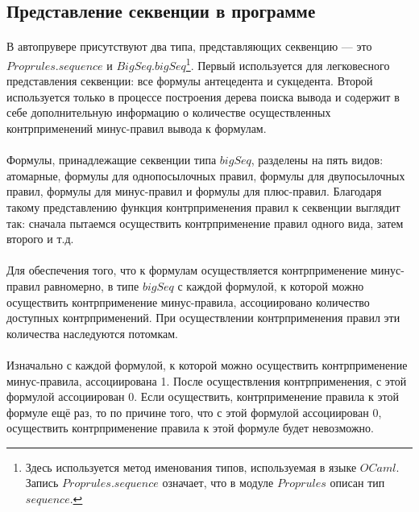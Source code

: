 \documentclass{cw1}
\begin{document}
\subsection{Представление секвенции в программе}
\label{sec:sequences}
\paragraph{}
В автопрувере присутствуют два типа, представляющих секвенцию --- это $Proprules.sequence$ и
$BigSeq.bigSeq$\footnote{Здесь используется метод именования типов, используемая в языке $OCaml$.
Запись $Proprules.sequence$ означает, что в модуле $Proprules$ описан тип $sequence$.}.
Первый используется для легковесного представления секвенции: все формулы
антецедента и сукцедента. Второй используется только в процессе построения дерева поиска вывода
и содержит в себе дополнительную информацию о количестве осуществленных контрприменений
минус-правил вывода к формулам. 
\paragraph{}
Формулы, принадлежащие секвенции типа $bigSeq$, разделены на пять видов: атомарные, формулы для
однопосылочных правил, формулы для двупосылочных правил, формулы для минус-правил и формулы                                                             
для плюс-правил. Благодаря такому представлению функция контрприменения
правил к секвенции выглядит так: сначала пытаемся осуществить контрприменение правил одного
вида, затем второго и т.д.
\paragraph{}
Для обеспечения того, что к формулам осуществляется контрприменение минус-правил
равномерно, в типе $bigSeq$ с каждой формулой, к которой можно осуществить контрприменение
минус-правила, ассоциировано
количество доступных контрприменений. При осуществлении контрприменения правил эти количества наследуются потомкам.
\paragraph{}
Изначально с каждой формулой, к которой можно осуществить контрприменение минус-правила,
ассоциирована 1. После осуществления
контрприменения, с этой формулой ассоциирован 0. Если осуществить, контрприменение
правила к этой формуле ещё раз, то по причине того, что с этой формулой ассоциирован 0,
осуществить контрприменение правила к этой формуле будет невозможно.
\end{document}
